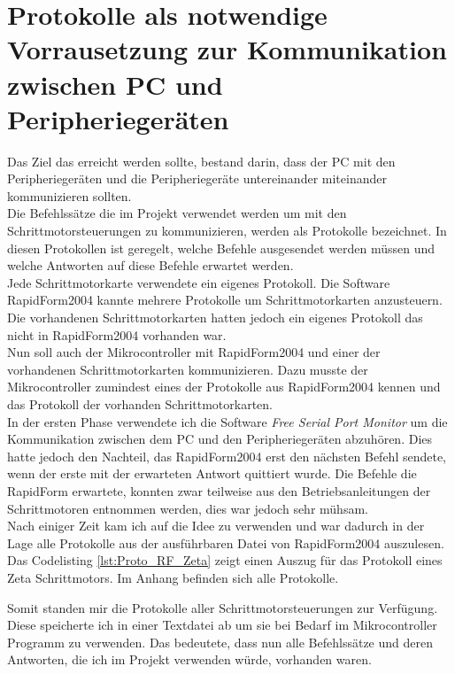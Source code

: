 \section{Protokolle als notwendige Vorrausetzung zur Kommunikation zwischen PC und Peripheriegeräten} 
\label{sec:Protokolle}
Das Ziel das erreicht werden sollte, bestand darin, dass der PC mit den Peripheriegeräten und die Peripheriegeräte untereinander miteinander kommunizieren sollten.\\
Die Befehlssätze die im Projekt verwendet werden um mit den Schrittmotorsteuerungen zu kommunizieren, werden als Protokolle bezeichnet. In diesen Protokollen ist geregelt, welche Befehle ausgesendet werden müssen und welche Antworten auf diese Befehle erwartet werden.\\
Jede Schrittmotorkarte verwendete ein eigenes Protokoll.
Die Software RapidForm2004 kannte mehrere Protokolle um Schrittmotorkarten anzusteuern. Die vorhandenen Schrittmotorkarten hatten jedoch ein eigenes Protokoll das nicht in RapidForm2004 vorhanden war.\\
Nun soll auch der Mikrocontroller mit RapidForm2004 und einer der vorhandenen Schrittmotorkarten kommunizieren. 
Dazu musste der Mikrocontroller zumindest eines der Protokolle aus RapidForm2004 kennen und das Protokoll der vorhanden Schrittmotorkarten.\\
In der ersten Phase verwendete ich die Software \emph{Free Serial Port Monitor} um die Kommunikation zwischen dem PC und den Peripheriegeräten abzuhören. Dies hatte jedoch den Nachteil, das RapidForm2004 erst den nächsten Befehl sendete, wenn der erste mit der erwarteten Antwort quittiert wurde. Die Befehle die RapidForm erwartete, konnten zwar teilweise aus den Betriebsanleitungen der Schrittmotoren entnommen werden, dies war jedoch sehr mühsam.\\
Nach einiger Zeit kam ich auf die Idee  zu verwenden und war dadurch in der Lage alle Protokolle aus der ausführbaren Datei von RapidForm2004 auszulesen.\\
Das Codelisting \ref{lst:Proto_RF_Zeta} zeigt einen Auszug für das Protokoll eines Zeta Schrittmotors. Im Anhang befinden sich alle Protokolle.
\lstset{language=C, basicstyle=\footnotesize, showstringspaces=false, tabsize=8}

Somit standen mir die Protokolle aller Schrittmotorsteuerungen zur Verfügung. Diese speicherte ich in einer Textdatei ab um sie bei Bedarf im Mikrocontroller Programm zu verwenden. Das bedeutete, dass nun alle Befehlssätze und deren Antworten, die ich im Projekt verwenden würde, vorhanden waren.

